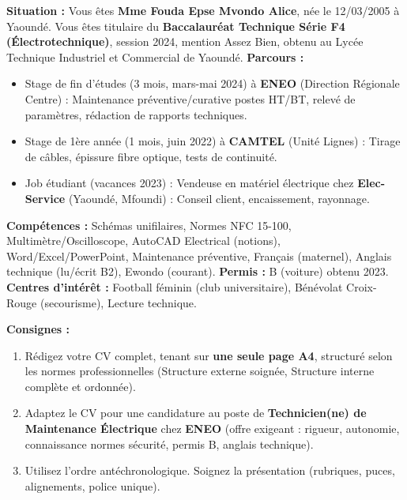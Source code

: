 \documentclass[11pt]{article}
\begin{document}
\begin{exercice}
\textbf{Situation :} Vous êtes \textbf{Mme Fouda Epse Mvondo Alice}, née le 12/03/2005 à Yaoundé. Vous êtes titulaire du \textbf{Baccalauréat Technique Série F4 (Électrotechnique)}, session 2024, mention Assez Bien, obtenu au Lycée Technique Industriel et Commercial de Yaoundé.
\textbf{Parcours :}
\begin{itemize}
\item Stage de fin d'études (3 mois, mars-mai 2024) à \textbf{ENEO} (Direction Régionale Centre) : Maintenance préventive/curative postes HT/BT, relevé de paramètres, rédaction de rapports techniques.
\item Stage de 1ère année (1 mois, juin 2022) à \textbf{CAMTEL} (Unité Lignes) : Tirage de câbles, épissure fibre optique, tests de continuité.
\item Job étudiant (vacances 2023) : Vendeuse en matériel électrique chez \textbf{Elec-Service} (Yaoundé, Mfoundi) : Conseil client, encaissement, rayonnage.
\end{itemize}
\textbf{Compétences :} Schémas unifilaires, Normes NFC 15-100, Multimètre/Oscilloscope, AutoCAD Electrical (notions), Word/Excel/PowerPoint, Maintenance préventive, Français (maternel), Anglais technique (lu/écrit B2), Ewondo (courant).
\textbf{Permis :} B (voiture) obtenu 2023.
\textbf{Centres d'intérêt :} Football féminin (club universitaire), Bénévolat Croix-Rouge (secourisme), Lecture technique.

\textbf{Consignes :}
\begin{enumerate}
\item Rédigez votre CV complet, tenant sur \textbf{une seule page A4}, structuré selon les normes professionnelles (Structure externe soignée, Structure interne complète et ordonnée).
\item Adaptez le CV pour une candidature au poste de \textbf{Technicien(ne) de Maintenance Électrique} chez \textbf{ENEO} (offre exigeant : rigueur, autonomie, connaissance normes sécurité, permis B, anglais technique).
\item Utilisez l'ordre antéchronologique. Soignez la présentation (rubriques, puces, alignements, police unique).
\end{enumerate}
\end{exercice}
\end{document}
